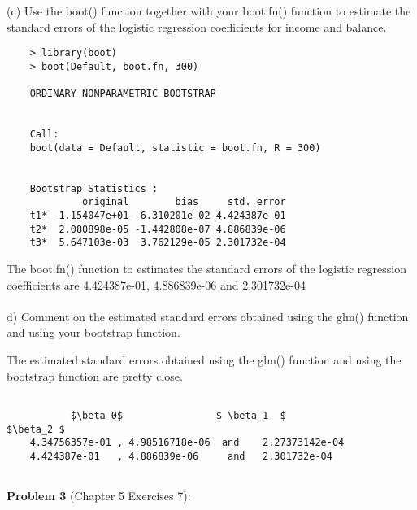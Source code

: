 \documentclass{article}
\begin{document}
(c) Use the boot() function together with your boot.fn() function to estimate the standard errors of the logistic regression coefficients for income and balance.

\begin{program}
	\begin{verbatim}
	> library(boot)
	> boot(Default, boot.fn, 300)
	
	ORDINARY NONPARAMETRIC BOOTSTRAP
	
	
	Call:
	boot(data = Default, statistic = boot.fn, R = 300)
	
	
	Bootstrap Statistics :
	         original        bias     std. error
	t1* -1.154047e+01 -6.310201e-02 4.424387e-01
	t2*  2.080898e-05 -1.442808e-07 4.886839e-06
	t3*  5.647103e-03  3.762129e-05 2.301732e-04
	\end{verbatim}
\end{program}

The boot.fn() function to estimates the standard errors of the logistic regression coefficients are 4.424387e-01, 4.886839e-06 and 2.301732e-04 \\
\\

d) Comment on the estimated standard errors obtained using the glm() function and using your bootstrap function.


The estimated standard errors obtained using the glm() function and using the bootstrap function are pretty close.
 
 \begin{program}
 	\begin{lstlisting}
 	
 	       $\beta_0$                $ \beta_1  $                     $\beta_2 $
	4.34756357e-01 , 4.98516718e-06  and    2.27373142e-04 
	4.424387e-01   , 4.886839e-06     and   2.301732e-04
	 	
 	\end{lstlisting}
 \end{program}
 
\newpage

{\bf Problem 3} (Chapter 5 Exercises 7):\\
\end{document}
